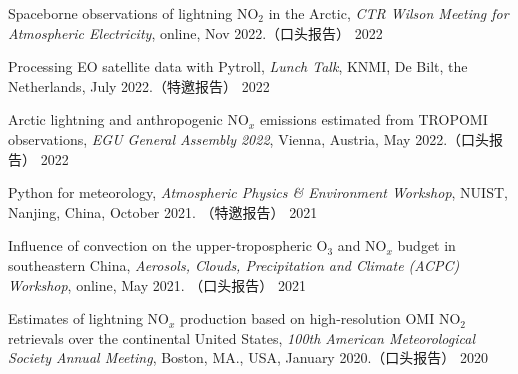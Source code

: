 

\begin{cvpresentations}

\publication
{Spaceborne observations of lightning NO$_2$ in the Arctic,
\emph{CTR Wilson Meeting for Atmospheric Electricity},
online, Nov 2022.（口头报告）} %
{2022} %


\publication
{Processing EO satellite data with Pytroll,
\emph{Lunch Talk},
KNMI, De Bilt, the Netherlands, July 2022.（特邀报告）} %
{2022} %

\publication
{Arctic lightning and anthropogenic NO$_x$ emissions estimated from TROPOMI observations,
\emph{EGU General Assembly 2022},
Vienna, Austria, May 2022.（口头报告）} %
{2022} %

\publication
{Python for meteorology,
\emph{Atmospheric Physics \& Environment Workshop},
NUIST, Nanjing, China, October 2021. （特邀报告）} %
{2021} %

\publication
{Influence of convection on the upper-tropospheric O$_3$ and NO$_x$ budget in southeastern China,
\emph{Aerosols, Clouds, Precipitation and Climate (ACPC) Workshop},
online, May 2021. （口头报告）} %
{2021} %


\publication
{Estimates of lightning NO$_x$ production based on high-resolution OMI NO$_2$ retrievals over the continental United States,
\emph{100th American Meteorological Society Annual Meeting},
Boston, MA., USA, January 2020.（口头报告）} %
{2020} %


\end{cvpresentations}
